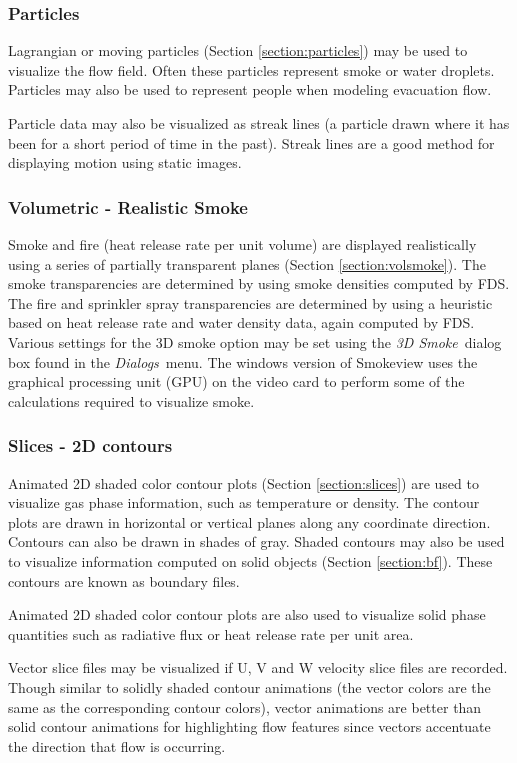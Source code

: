 \documentclass[11pt,twoside]{book}
\begin{document}
\subsubsection{Particles} Lagrangian or moving particles
(Section \ref{section:particles}) may be
used to visualize the flow field. Often these particles represent
smoke or water droplets.  Particles may also be used to represent
people when modeling evacuation flow.

Particle data may also be visualized as streak lines (a particle
drawn where it has been for a short period of time in the past).
Streak lines are a good method for displaying motion using static
images.

\subsubsection{Volumetric - Realistic Smoke}
Smoke and fire (heat release rate per unit volume) are displayed
realistically using a series of partially transparent planes
(Section \ref{section:volsmoke}). The smoke transparencies are
determined by using smoke densities computed by FDS.  The fire and
sprinkler spray transparencies are determined by using a heuristic
based on heat release rate and water density data, again computed
by FDS. Various settings for the 3D smoke option may be set using
the {\em 3D Smoke}\ dialog box found in the {\em Dialogs}\ menu.
The windows version of Smokeview uses the graphical processing
unit (GPU) on the video card to perform some of the calculations
required to visualize smoke.

\subsubsection{Slices - 2D contours}
Animated 2D shaded color contour plots (Section
\ref{section:slices}) are used to visualize gas phase information,
such as temperature or density. The contour plots are drawn in
horizontal or vertical planes along any coordinate direction.
Contours can also be drawn in shades of gray.
Shaded contours may also be used to visualize information
computed on solid objects (Section \ref{section:bf}).  These contours are known as boundary files.

Animated 2D shaded color contour plots are also used to
visualize solid phase quantities such as radiative flux or
heat release rate per unit area.

Vector slice files may be visualized if U, V and W velocity slice files are recorded.
Though
similar to solidly shaded contour animations (the vector colors are
the same as the corresponding contour colors), vector animations are better
than solid contour animations for highlighting flow
features since vectors accentuate the direction that flow is occurring.
\end{document}
